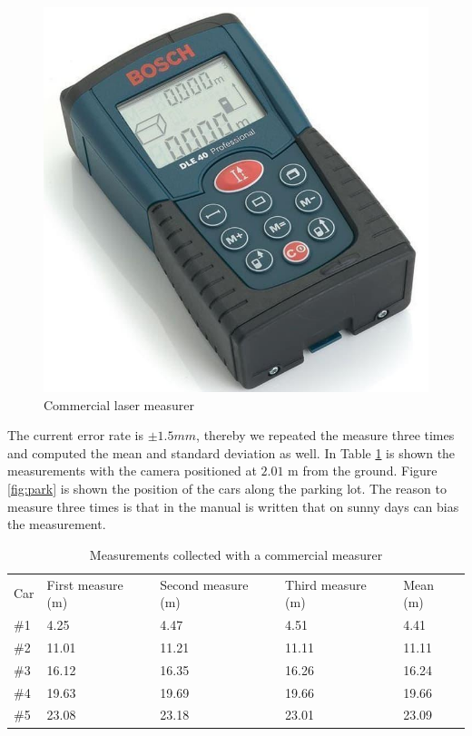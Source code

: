 \begin{figure}[H]
\centering
\includegraphics[scale=0.3]{imagens/trena.jpg}
\caption{Commercial laser measurer}
\label{fig:laser_meas}
\end{figure}

The current error rate is $\pm 1.5 mm$, thereby we repeated the measure three times and computed the mean and standard deviation as well. In Table \ref{tab:tab_measure} is shown the measurements with the camera positioned at $2.01$ m from the ground. Figure \ref{fig:park} is shown the position of the cars along the parking lot. The reason to measure three times is that in the manual is written that on sunny days can bias the measurement. 



\begin{table}[H]
\centering
\caption{Measurements collected with a commercial measurer}
\begin{tabular}{l|l|l|l|l} 
\toprule
Car & First measure (m) & Second measure (m) & Third measure (m) & Mean (m) \\
\#1   & 4.25          & 4.47           & 4.51           & 4.41 \\
\#2   & 11.01         & 11.21          & 11.11          & 11.11\\
\#3   & 16.12         & 16.35          & 16.26          & 16.24\\
\#4   & 19.63         & 19.69          & 19.66          & 19.66\\
\#5   & 23.08         & 23.18          & 23.01          & 23.09\\
\bottomrule
\end{tabular}
\label{tab:tab_measure}
\end{table} 


